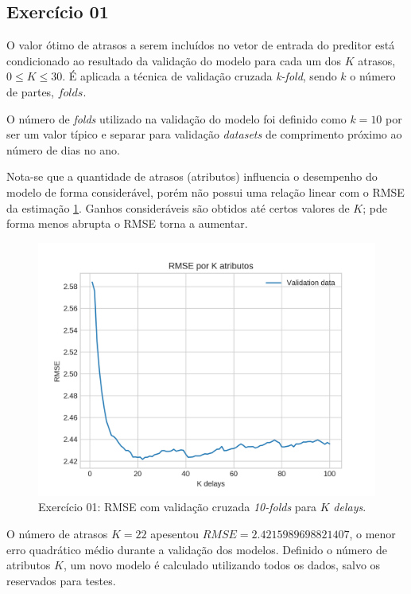 \documentclass{article}
\begin{document}
    \subsection[]{Exercício 01}
    O valor ótimo de atrasos a serem incluídos no vetor de entrada do preditor está condicionado
    ao resultado da validação do modelo para cada um dos $K$ atrasos, $0\leqslant K \leqslant  30$.
    É aplicada a técnica de validação cruzada \textit{k-fold}, sendo $k$ o número de partes, $folds$.

    O número de \textit{folds} utilizado na validação do modelo foi definido como $k=10$ por ser um valor
    típico e separar para validação \textit{datasets} de comprimento próximo ao número de dias no ano. 
    
    Nota-se que a quantidade de atrasos (atributos) influencia o desempenho do modelo de forma considerável,
    porém não possui uma relação linear com o RMSE da estimação \ref{fig:ex1_kfold_rmse}. Ganhos consideráveis
    são obtidos até certos valores de $K$; pde forma menos abrupta o RMSE torna a aumentar.
    \begin{figure}[!h]
        \centering
        \includegraphics[width=\linewidth]{ex01/folds.png}
        \caption{Exercício 01: RMSE com validação cruzada \textit{10-folds} para $K$ \textit{delays}.}
        \label{fig:ex1_kfold_rmse}
    \end{figure}
    O número de atrasos $K=22$ apesentou $RMSE=2.4215989698821407$, o menor erro quadrático médio durante a validação dos modelos.
    Definido o número de atributos $K$, um novo modelo é calculado utilizando todos os dados, salvo os reservados para testes.
\end{document}
